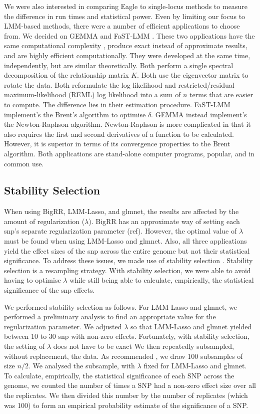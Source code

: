 \documentclass{article}
\begin{document}
We were also interested in comparing Eagle to single-locus methods to measure the difference in run times and statistical power. Even by limiting our focus to LMM-based methods, there were a number of efficient applications to choose from. 
We decided on GEMMA \cite{zhou2012genome} and FaST-LMM \cite{lippert2011fast}. These two applications have the same computational complexity \cite{zhou2012genome}, produce exact instead of approximate results, and are highly efficient computationally. They were developed at the same time, independently, but are similar theoretically. Both perform a single spectral decomposition of the relationship matrix $K$. Both use the eigenvector matrix to rotate the data. Both reformulate the log likelihood and 
restricted/residual maximum-likelihood (REML) 
log likelihood into a sum of $n$ terms that are easier to compute. The difference lies in their estimation procedure. FaST-LMM implement's the Brent's algorithm to optimise $\delta$. GEMMA instead implement's the Newton-Raphson algorithm. Newton-Raphson is more complicated in that it also requires the first and second derivatives of a function to be calculated. However, it is superior in terms of its convergence properties to the Brent algorithm.  Both applications are stand-alone computer programs, popular, and in common use.


\subsection{Stability Selection}
When using BigRR, LMM-Lasso, and glmnet, the results are affected by the amount of regularization ($\lambda$). 
BigRR has an approximate way of setting each snp's separate regularization parameter (ref). However, the optimal value of 
$\lambda$ must be found when using LMM-Lasso and glmnet. Also, 
all three applications yield the effect sizes of the snp across the entire genome but not their statistical significance. To address 
these issues, we made use of stability selection \cite{meinshausen2010stability}. 
Stability selection is a resampling strategy.  With stability selection, we were able to avoid having to optimise $\lambda$ while 
still being able to calculate, empirically, the statistical significance of the snp effects.

We performed stability selection as follows. For LMM-Lasso and glmnet, we performed a preliminary analysis to find an 
appropriate value for the regularization parameter.  We adjusted $\lambda$ so that LMM-Lasso and glmnet yielded 
between 10 to 30 snp with non-zero effects. Fortunately, with stability selection, the setting of $\lambda$ does not have to be exact 
 We then repeatedly subsampled, 
without replacement, the data. As recommended \cite{meinshausen2010stability}, we draw 100 subsamples of size $n/2$. We 
analysed the subsample, with $\lambda$ fixed for LMM-Lasso and glmnet.  To calculate, empirically,  the statistical significance of each 
SNP across the genome, we counted the number of times a SNP had a non-zero effect size over all the replicates. We then 
divided this number by the number of replicates (which was 100) to form an empirical probability estimate of the significance of a SNP. 
\end{document}
